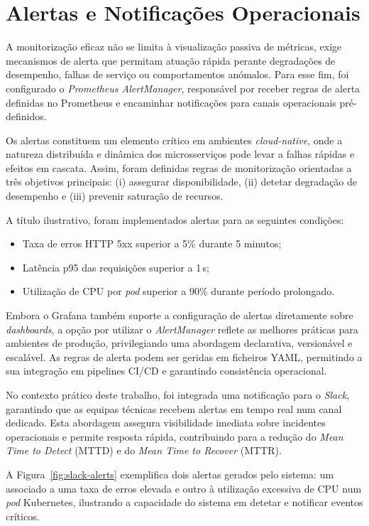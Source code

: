 \section{Alertas e Notificações Operacionais}

A monitorização eficaz não se limita à visualização passiva de métricas, exige mecanismos de alerta que permitam atuação rápida perante degradações de desempenho, falhas de serviço ou comportamentos anómalos. Para esse fim, foi configurado o \textit{Prometheus AlertManager}, responsável por receber regras de alerta definidas no Prometheus e encaminhar notificações para canais operacionais pré-definidos.

Os alertas constituem um elemento crítico em ambientes \textit{cloud-native}, onde a natureza distribuída e dinâmica dos microsserviços pode levar a falhas rápidas e efeitos em cascata. Assim, foram definidas regras de monitorização orientadas a três objetivos principais: (i) assegurar disponibilidade, (ii) detetar degradação de desempenho e (iii) prevenir saturação de recursos.

A título ilustrativo, foram implementados alertas para as seguintes condições:
\begin{itemize}
    \item Taxa de erros HTTP 5xx superior a 5\% durante 5 minutos;
    \item Latência p95 das requisições superior a 1\,s;
    \item Utilização de CPU por \textit{pod} superior a 90\% durante período prolongado.
\end{itemize}

Embora o Grafana também suporte a configuração de alertas diretamente sobre \textit{dashboards}, a opção por utilizar o \textit{AlertManager} reflete as melhores práticas para ambientes de produção, privilegiando uma abordagem declarativa, versionável e escalável. As regras de alerta podem ser geridas em ficheiros YAML, permitindo a sua integração em pipelines CI/CD e garantindo consistência operacional.

No contexto prático deste trabalho, foi integrada uma notificação para o \textit{Slack}, garantindo que as equipas técnicas recebem alertas em tempo real num canal dedicado. Esta abordagem assegura visibilidade imediata sobre incidentes operacionais e permite resposta rápida, contribuindo para a redução do \textit{Mean Time to Detect} (MTTD) e do \textit{Mean Time to Recover} (MTTR).

A Figura~\ref{fig:slack-alerts} exemplifica dois alertas gerados pelo sistema: um associado a uma taxa de erros elevada e outro à utilização excessiva de CPU num \textit{pod} Kubernetes, ilustrando a capacidade do sistema em detetar e notificar eventos críticos.

